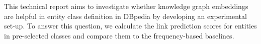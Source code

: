 This technical report aims to investigate whether knowledge graph embeddings are helpful in entity class definition in DBpedia by developing an experimental set-up. To answer this question, we calculate the link prediction scores for entities in pre-selected classes and compare them to the frequency-based baselines.
